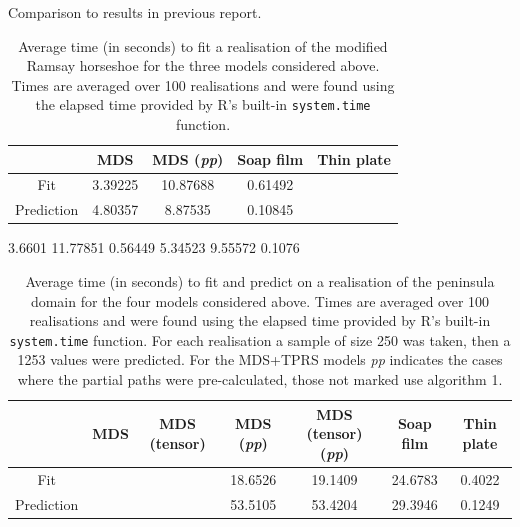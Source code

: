 \documentclass[a4paper,10pt]{article}
\begin{document}
Comparison to results in previous report.


\begin{table}[ht]
\centering
\begin{tabular}{c || c c c c}
 & MDS & MDS (\textit{pp})& Soap film & Thin plate\\ 
\hline
Fit & 3.39225 & 10.87688 & 0.61492\\
Prediction & 4.80357 & 8.87535 & 0.10845\\
\end{tabular}
\label{ramsaytime}
\caption{Average time (in seconds) to fit a realisation of the modified Ramsay horseshoe for the three models considered above. Times are averaged over 100 realisations and were found using the elapsed time provided by \textsf{R}'s built-in \texttt{system.time} function.}
\end{table}

3.6601 
11.77851 
0.56449 
5.34523 
9.55572 
0.1076 




\begin{table}[ht]
\centering
\begin{tabular}{c || c c c c c c}
 & MDS & MDS (tensor) & MDS (\textit{pp})& MDS (tensor) (\textit{pp})& Soap film & Thin plate\\ 
\hline
Fit & & & 18.6526 & 19.1409 & 24.6783 & 0.4022\\ 
Prediction & & & 53.5105 & 53.4204 & 29.3946 & 0.1249\\
\end{tabular}
\label{wt2time}
\caption{Average time (in seconds) to fit and predict on a realisation of the peninsula domain for the four models considered above. Times are averaged over 100 realisations and were found using the elapsed time provided by \textsf{R}'s built-in \texttt{system.time} function. For each realisation a sample of size 250 was taken, then a 1253 values were predicted. For the MDS+TPRS models \textit{pp} indicates the cases where the partial paths were pre-calculated, those not marked use algorithm 1.}
\end{table}

\end{document}
